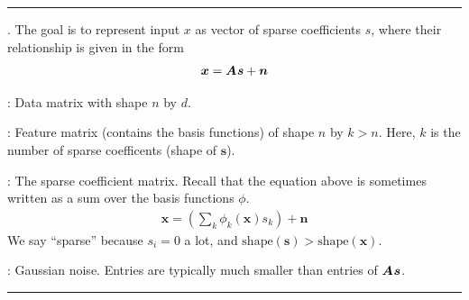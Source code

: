 \documentclass[12pt]{article}
\begin{document}
\hrule
\p {}. The goal is to represent input $x$ as vector of sparse coefficients $s$, where their relationship is given in the form 
\begin{align}
\bm{x}= \bm{A}_{} \bm{s} + \bm{n}
\end{align}
\begin{compactitem}[$\rightarrow$]
	\item {}: Data matrix with shape $n$ by $d$. 
	\item {}: Feature matrix (contains the basis functions) of shape $n$ by $k > n$. Here, $k$ is the number of sparse coefficents (shape of $\bm{s}$). 
	\item {}: The sparse coefficient matrix. Recall that the equation above is sometimes written as a sum over the basis functions $\phi$.
	\begin{align}
		\bm{x} = \left(\sum_k \phi_k (\bm{x})s_k\right) + \bm{n} 
	\end{align}
	We say ``sparse'' because $s_i = 0$ a lot, and $\text{shape}(\bm{s}) > \text{shape}(\bm{x})$. 
	\item {}: Gaussian noise. Entries are typically much smaller than entries of $\bm{A}_{}\bm{s}$.
\end{compactitem}
\hrule
\end{document}

